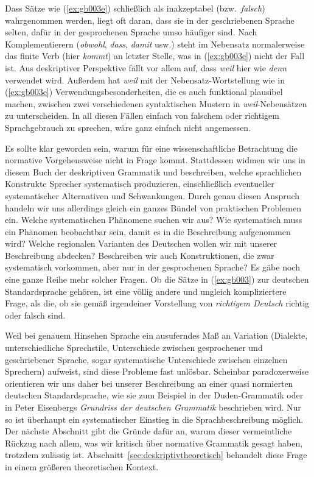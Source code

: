 Dass Sätze wie (\ref{ex:gb003e}) schließlich als inakzeptabel (bzw.\ \textit{falsch}) wahrgenommen werden, liegt oft daran, dass sie in der geschriebenen Sprache selten, dafür in der gesprochenen Sprache umso häufiger sind.
Nach Komplementierern (\textit{obwohl}, \textit{dass}, \textit{damit} usw.) steht im Nebensatz normalerweise das finite Verb (hier \textit{kommt}) an letzter Stelle, was in (\ref{ex:gb003e}) nicht der Fall ist.
Aus deskriptiver Perspektive fällt vor allem auf, dass \textit{weil} hier wie \textit{denn} verwendet wird.
Außerdem hat \textit{weil} mit der Nebensatz-Wortstellung wie in (\ref{ex:gb003e}) Verwendungsbesonderheiten, die es auch funktional plausibel machen, zwischen zwei verschiedenen syntaktischen Mustern in \textit{weil}-Nebensätzen zu unterscheiden.
In all diesen Fällen einfach von falschem oder richtigem Sprachgebrauch zu sprechen, wäre ganz einfach nicht angemessen.

Es sollte klar geworden sein, warum für eine wissenschaftliche Betrachtung die normative Vorgehensweise nicht in Frage kommt.
Stattdessen widmen wir uns in diesem Buch der deskriptiven Grammatik und beschreiben, welche sprachlichen Konstrukte Sprecher systematisch produzieren, einschließlich eventueller systematischer Alternativen und Schwankungen.
Durch genau diesen Anspruch handeln wir uns allerdings gleich ein ganzes Bündel von praktischen Problemen ein.
Welche systematischen Phänomene suchen wir aus?
Wie systematisch muss ein Phänomen beobachtbar sein, damit es in die Beschreibung aufgenommen wird?
Welche regionalen Varianten des Deutschen wollen wir mit unserer Beschreibung abdecken?
Beschreiben wir auch Konstruktionen, die zwar systematisch vorkommen, aber nur in der gesprochenen Sprache?
Es gäbe noch eine ganze Reihe mehr solcher Fragen.
Ob die Sätze in (\ref{ex:gb003}) zur deutschen Standardsprache gehören, ist eine völlig andere und ungleich kompliziertere Frage, als die, ob sie gemäß irgendeiner Vorstellung von \textit{richtigem Deutsch} richtig oder falsch sind.

Weil bei genauem Hinsehen Sprache ein ausuferndes Maß an Variation (Dialekte, unterschiedliche Sprechstile, Unterschiede zwischen gesprochener und geschriebener Sprache, sogar systematische Unterschiede zwischen einzelnen Sprechern) aufweist, sind diese Probleme fast unlösbar.
Scheinbar paradoxerweise orientieren wir uns daher bei unserer Beschreibung an einer quasi normierten deutschen Standardsprache, wie sie zum Beispiel in der Duden-Grammatik oder in Peter Eisenbergs \textit{Grundriss der deutschen Grammatik} \citep{Eisenberg1,Eisenberg2} beschrieben wird.
Nur so ist überhaupt ein systematischer Einstieg in die Sprachbeschreibung möglich.
Der nächste Abschnitt gibt die Gründe dafür an, warum dieser vermeintliche Rückzug nach allem, was wir kritisch über normative Grammatik gesagt haben, trotzdem zulässig ist.
Abschnitt~\ref{sec:deskriptivtheoretisch} behandelt diese Frage in einem größeren theoretischen Kontext.


